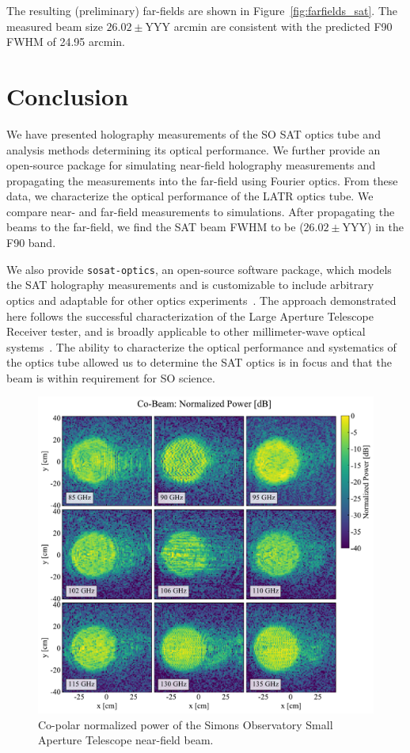 The resulting (preliminary) far-fields are shown in Figure~\ref{fig:farfields_sat}.  The measured beam size $26.02\pm $YYY arcmin are consistent with the predicted F90 FWHM of 24.95 arcmin.

\section{Conclusion}
\label{sec:sat_discussion}

We have presented holography measurements of the SO SAT optics tube and analysis methods determining its optical performance.  We further provide an open-source package for simulating near-field holography measurements and propagating the measurements into the far-field using Fourier optics.  From these data, we characterize the optical performance of the LATR optics tube.  We compare near- and far-field measurements to simulations.  After propagating the beams to the far-field, we find the SAT beam FWHM to be ($26.02\pm $YYY) in the F90 band.

We also provide \verb|sosat-optics|, an open-source software package, which models the SAT holography measurements and is customizable to include arbitrary optics and adaptable for other optics experiments~\cite{sat_sim_model}.  The approach demonstrated here follows the successful characterization of the Large Aperture Telescope Receiver tester, and is broadly applicable to other millimeter-wave optical systems~\cite{chesmore2022}.  The ability to characterize the optical performance and systematics of the optics tube allowed us to determine the SAT optics is in focus and that the beam is within requirement for SO science. 

\begin{figure}
    \centering
    \includegraphics[width = \textwidth]{Figures/SAT_MF1_co-beam.pdf}
    \caption{Co-polar normalized power of the Simons Observatory Small Aperture Telescope near-field beam.}
    \label{fig:sat_mf_cobeam}
\end{figure}

